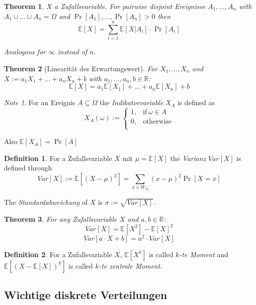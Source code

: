 \documentclass[12pt]{extarticle}
\theoremstyle{definition}
\newtheorem{definition}{Definition}
\theoremstyle{remark}
\newtheorem{note}{Note}
\theoremstyle{plain}
\newtheorem{theorem}{Theorem}
\theoremstyle{plain}
\theoremstyle{plain}
\newcommand{\E}{\mathbb{E}}
\begin{document}
\begin{theorem}
    $X$ a Zufallsvariable. For pairwise disjoint Ereignisse $A_1, ..., A_n$ with $A_1 \cup ... \cup A_n = \Omega$ and
    $\Pr[A_1],...,\Pr[A_n] > 0$ then
    \[ \E[X] = \sum_{i=1}^n \E[X | A_i] \cdot \Pr[A_i] \]

    Analogous for $\infty$ instead of $n$.
\end{theorem}

\begin{theorem}[Linearität des Erwartungswert]
    For $X_1, ..., X_n$ and $X := a_1 X_1 + ... + a_n X_n + b$ with $a_1, ..., a_n, b \in \mathbb{R}$:
    \[ \E[X] = a_1 \E[X_1] + ... + a_n \E[X_n] + b \]
\end{theorem}

\begin{note}
    For an Ereignis $A \subseteq \Omega$ the \textit{Indikatorvariable} $X_A$ is defined as
    \[ X_A(\omega) := \begin{cases}
            1, & \mbox{if}\ \omega \in A \\
            0, & \mbox{otherwise}        \\
        \end{cases} \]

    Also $\E[X_A] = \Pr[A]$
\end{note}

\begin{definition}
    For a Zufallsvariable $X$ mit $\mu = \E[X]$ the \textit{Varianz} $Var[X]$ is defined through
    \[ Var[X] := \E[(X - \mu)^2] = \sum_{x \in W_X} (x - \mu)^2 \Pr[X = x] \]

    The \textit{Standardabweichung} of $X$ is $\sigma := \sqrt{Var[X]}$.
\end{definition}

\begin{theorem}
    For any Zufallsvariable $X$ and $a,b \in \mathbb{R}$:
    \[ Var[X] = \E[X^2] - \E[X]^2 \]
    \[ Var[a \cdot X + b] = a^2 \cdot Var[X] \]
\end{theorem}

\begin{definition}
    For a Zufallsvariable $X$, $\E[X^k]$ is called \textit{$k$-te Moment} and
    $\E[(X - \E[X])^k]$ is called \textit{$k$-te zentrale Moment}.
\end{definition}

\subsection{Wichtige diskrete Verteilungen}
\end{document}

